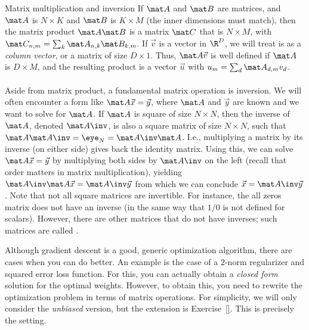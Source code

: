\begin{mathreview}{Matrix multiplication and inversion}
  If $\mat A$ and $\mat B$ are matrices, and $\mat A$ is $N \times K$ and $\mat B$ is $K \times M$ (the inner dimensions must match), then the matrix product $\mat A \mat B$ is a matrix $\mat C$ that is $N \times M$, with $\mat C_{n,m} = \sum_k \mat A_{n,k} \mat B_{k,m}$.
If $\vec v$ is a vector in $\R^D$, we will treat is as a \emph{column vector}, or a matrix of size $D \times 1$.
Thus, $\mat A \vec v$ is well defined if $\mat A$ is $D \times M$, and the resulting product is a vector $\vec u$ with $u_m = \sum_d \mat A_{d,m} v_d$.
  ~\\~\\
  Aside from matrix product, a fundamental matrix operation is inversion. We will often encounter a form like $\mat A \vec x = \vec y$, where $\mat A$ and $\vec y$ are known and we want to solve for $\mat A$.
  If $\mat A$ is square of size $N \times N$, then the inverse of $\mat A$, denoted $\mat A\inv$, is also a square matrix of size $N \times N$, such that $\mat A \mat A\inv = \eye_N = \mat A\inv \mat A$. I.e., multiplying a matrix by its inverse (on either side) gives back the identity matrix.
  Using this, we can solve $\mat A \vec x = \vec y$ by multiplying both sides by $\mat A\inv$ on the left (recall that order matters in matrix multiplication), yielding $\mat A\inv \mat A \vec x = \mat A\inv \vec y$ from which we can conclude $\vec x = \mat A\inv\vec y$.
  Note that not all square matrices are invertible. For instance, the all zeros matrix does not have an inverse (in the same way that $1/0$ is not defined for scalars).
  However, there are other matrices that do not have inverses; such matrices are called .
\end{mathreview}

Although gradient descent is a good, generic optimization algorithm,
there are cases when you can do better.  An example is the case of a
$2$-norm regularizer and squared error loss function.  For this, you
can actually obtain a \emph{closed form} solution for the optimal
weights.  However, to obtain this, you need to rewrite the
optimization problem in terms of matrix operations.  For simplicity,
we will only consider the \emph{unbiased} version, but the extension
is Exercise~\ref{}.  This is precisely the 
setting.

